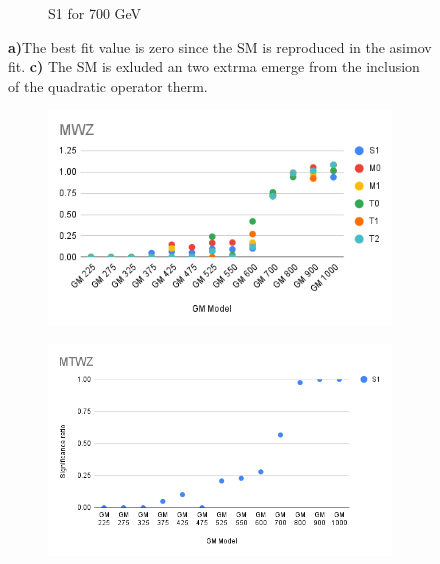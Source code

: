 \documentclass[../Bachelorarbeit.tex]{subfiles}
\begin{document}
\begin{figure}[h]
\begin{subfigure}{0.3\textwidth}
        \caption{S1 for 700 GeV}
    \end{subfigure}
    \caption{\textbf{a)}The best fit value is zero since the SM is reproduced in the asimov fit.
    \textbf{c)} The SM is exluded an two extrma emerge from the inclusion of the quadratic operator therm.}
    \label{fig:EFT_GM_Asimov_comparision}
\end{figure}

\begin{figure}
    \centering
    \begin{subfigure}{0.45\textwidth}
        \includegraphics[width=\textwidth]{Plots/significans/MWZ.png}
        \caption{}
    \end{subfigure}
    \begin{subfigure}{0.45\textwidth}
        \includegraphics[width=\textwidth]{Plots/significans/MTWZ.png}
        \caption{}
    \end{subfigure}
    \caption{}
    \label{fig:significans_plots}
\end{figure}
\end{document}
